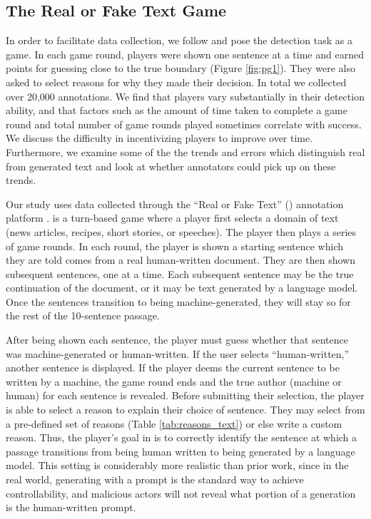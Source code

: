 \subsection{The Real or Fake Text Game}
In order to facilitate data collection, we follow \citet{dugan2020roft} and pose the detection task as a game.
In each game round, players were shown one sentence at a time and earned points for guessing close to the true boundary (Figure \ref{fig:pg1}).
They were also asked to select reasons for why they made their decision.
In total we collected over 20,000 annotations.
We find that players vary substantially in their detection ability, and that factors such as the amount of time taken to complete a game round and total number of game rounds played sometimes correlate with success.
We discuss the difficulty in incentivizing players to improve over time.
Furthermore, we examine some of the the trends and errors which distinguish real from generated text and look at whether annotators could pick up on these trends.



Our study uses data collected through the ``Real or Fake Text'' (\ROFT{}) annotation platform \citep{dugan2020roft}.
\ROFT{} is a turn-based game where a player first selects a domain of text (news articles, recipes, short stories, or speeches).
The player then plays a series of game rounds.
In each round, the player is shown a starting sentence which they are told comes from a real human-written document.
They are then shown subsequent sentences, one at a time.
Each subsequent sentence may be the true continuation of the document, or it may be text generated by a language model.
Once the sentences transition to being machine-generated, they will stay so for the rest of the 10-sentence passage.

After being shown each sentence, the player must guess whether that sentence was machine-generated or human-written.
If the user selects ``human-written,'' another sentence is displayed.
If the player deems the current sentence to be written by a machine, the game round ends and the true author (machine or human) for each sentence is revealed.
Before submitting their selection, the player is able to select a reason to explain their choice of sentence.
They may select from a pre-defined set of reasons (Table \ref{tab:reasons_text}) or else write a custom reason.
Thus, the player's goal in \ROFT{} is to correctly identify the sentence at which a passage transitions from being human written to being generated by a language model.
This setting is considerably more realistic than prior work, since in the real world, generating with a prompt is the standard way to achieve controllability, and malicious actors will not reveal what portion of a generation is the human-written prompt.

